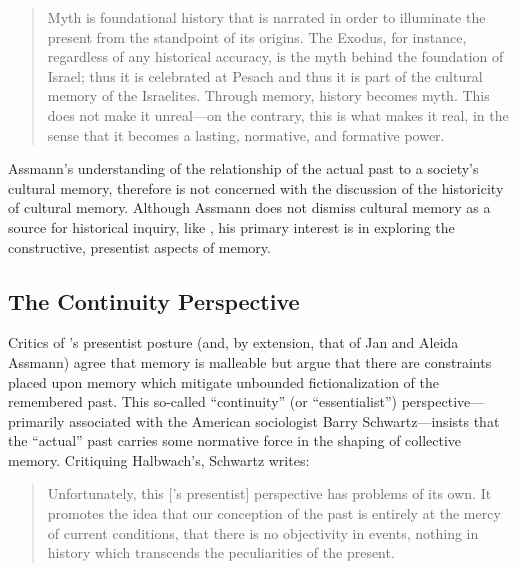\begin{quote}
Myth is foundational history that is narrated in order to illuminate the
present from the standpoint of its origins. The Exodus, for instance,
regardless of any historical accuracy, is the myth behind the foundation
of Israel; thus it is celebrated at Pesach and thus it is part of the
cultural memory of the Israelites. Through memory, history becomes myth.
This does not make it unreal---on the contrary, this is what makes it
real, in the sense that it becomes a lasting, normative, and formative
power.\autocite[38]{assmann2011}
\end{quote}

Assmann's understanding of the relationship of the actual past to a
society's cultural memory, therefore is not concerned with the
discussion of the historicity of cultural memory. Although Assmann does
not dismiss cultural memory as a source for historical inquiry, like
\halbwachs, his primary interest is in exploring the
constructive, presentist aspects of memory.

\hypertarget{the-continuity-perspective}{%
\subsection{The Continuity
Perspective}\label{the-continuity-perspective}}

Critics of \halbwachs's presentist posture (and, by
extension, that of Jan and Aleida Assmann) agree that memory is
malleable but argue that there are constraints placed upon memory which
mitigate unbounded fictionalization of the remembered past. This
so-called ``continuity'' (or ``essentialist'') perspective---primarily
associated with the American sociologist Barry Schwartz---insists that
the ``actual'' past carries some normative force in the shaping of
collective memory.\autocites[Schwartz has made numerous contributions to
the field of memory studies. See
esp.][]{schwartz_sf1982}{schwartz_asr1991}[and][]{schwartz2000}[Note
also the SBL volume specifically interacting with his
work:][]{thatcher2014} Critiquing Halbwach's, Schwartz writes:

\begin{quote}
Unfortunately, this {[}\halbwachs's presentist{]}
perspective has problems of its own. It promotes the idea that our
conception of the past is entirely at the mercy of current conditions,
that there is no objectivity in events, nothing in history which
transcends the peculiarities of the
present.\autocite[376]{schwartz_sf1982}
\end{quote}

